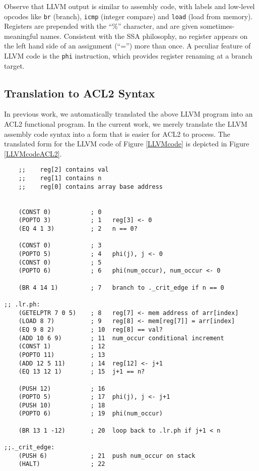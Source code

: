 \documentclass{eptcs}
\begin{document}
Observe that LLVM output is similar to assembly code, with labels and
low-level opcodes like \texttt{br} (branch), \texttt{icmp} (integer
compare) and \texttt{load} (load from memory).  Registers are
prepended with the ``\%'' character, and are given
sometimes-meaningful names.  Consistent with the SSA philosophy, no
register appears on the left hand side of an assignment (``='') more
than once.  A peculiar feature of LLVM code is the \texttt{phi}
instruction, which provides register renaming at a branch target.

\subsection{Translation to ACL2 Syntax}\label{translation}

In previous work, we automatically translated the above LLVM program 
into an ACL2 functional program.  In the current work, we merely translate
the LLVM assembly code syntax into a form that is easier for ACL2 to process.
The translated form for the LLVM code 
of Figure \ref{LLVMcode} is depicted in Figure \ref{LLVMcodeACL2}. 

\begin{figure*}
\begin{verbatim}
    ;;    reg[2] contains val
    ;;    reg[1] contains n
    ;;    reg[0] contains array base address


    (CONST 0)           ; 0
    (POPTO 3)           ; 1   reg[3] <- 0
    (EQ 4 1 3)          ; 2   n == 0?

    (CONST 0)           ; 3
    (POPTO 5)           ; 4   phi(j), j <- 0
    (CONST 0)           ; 5
    (POPTO 6)           ; 6   phi(num_occur), num_occur <- 0

    (BR 4 14 1)         ; 7   branch to ._crit_edge if n == 0

;; .lr.ph:
    (GETELPTR 7 0 5)    ; 8   reg[7] <- mem address of arr[index]
    (LOAD 8 7)          ; 9   reg[8] <- mem[reg[7]] = arr[index]
    (EQ 9 8 2)          ; 10  reg[8] == val?
    (ADD 10 6 9)        ; 11  num_occur conditional increment
    (CONST 1)           ; 12
    (POPTO 11)          ; 13
    (ADD 12 5 11)       ; 14  reg[12] <- j+1
    (EQ 13 12 1)        ; 15  j+1 == n?

    (PUSH 12)           ; 16
    (POPTO 5)           ; 17  phi(j), j <- j+1
    (PUSH 10)           ; 18
    (POPTO 6)           ; 19  phi(num_occur)

    (BR 13 1 -12)       ; 20  loop back to .lr.ph if j+1 < n

;;._crit_edge:
    (PUSH 6)            ; 21  push num_occur on stack
    (HALT)              ; 22
\end{verbatim}
\hrulefill
\caption{ACL2 representation of the LLVM code for the occurrences example.}
\label{LLVMcodeACL2}
\end{figure*}
\end{document}

